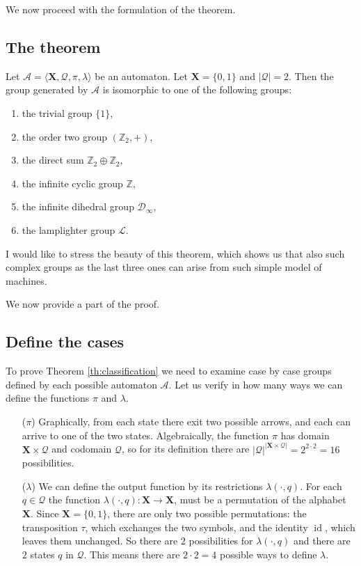 \documentclass[mat1]{fmfdeloTS2.0}
\newcommand{\Z}{\mathbb Z}
\newcommand{\obs}{}				%
\newcommand{\abece}{\mathbf{X}}			%
\newcommand{\auto}{\mathcal}			%
\newcommand{\QQ}{\mathcal{Q}}			%
\newcommand{\LL}{\mathcal{L}}		%
\DeclareMathOperator{\id}{\mathrm{id}}			%
\begin{document}
We now proceed with the formulation of the theorem.

\smallskip
\subsection{The theorem}

\begin{theorem}\label{th:classification}
Let $\auto{A}=\langle\abece, \QQ, \pi, \lambda\rangle$ be an automaton. Let $\abece=\{0,1\}$ and $|\QQ|=2$. Then the group generated by $\auto{A}$ is isomorphic to one of the following groups:
\begin{enumerate}
\item the trivial group $\{1\}$,
\item the order two group $(\Z_2,+)$,
\item the direct sum $\Z_2\oplus\Z_2$,
\item the infinite cyclic group $\Z$,
\item the infinite dihedral group $\mathcal{D}_\infty$,
\item the lamplighter group $\LL$.
\end{enumerate}
\end{theorem}

I would like to stress the beauty of this theorem, which shows us that also such complex groups as the last three ones can arise from such simple model of machines.

We now provide a part of the proof.

\subsection{Define the cases}
To prove Theorem \autoref{th:classification} we need to examine case by case groups defined by each possible automaton $\auto{A}$. Let us verify in how many ways we can define the functions $\pi$ and $\lambda$.

\begin{itemize}
\item[($\pi$)] Graphically, from each state there exit two possible arrows, and each can arrive to one of the two states. Algebraically, the function $\pi$ has domain $\abece\times\QQ$ and codomain $\QQ$, so for its definition there are $|\QQ|^{|\abece\times\QQ|} = 2^{2\cdot 2} = 16$ possibilities.
\item[($\lambda$)] We can define the output function by its restrictions $\lambda(\cdot,q)$. For each $q\in\QQ$ the function $\lambda(\cdot,q):\abece\longrightarrow\abece$, must be a \obs{permutation} of the alphabet $\abece$. Since $\abece=\{0,1\}$, there are only two possible permutations: the transposition $\tau$, which exchanges the two symbols, and the identity $\id$, which leaves them unchanged. So there are $2$ possibilities for $\lambda(\cdot,q)$ and there are $2$ states $q$ in $\QQ$. This means there are $2\cdot2=4$ possible ways to define $\lambda$. 
\end{itemize}
\end{document}
